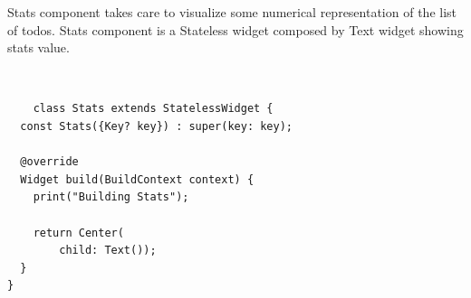 	Stats component takes care to visualize some numerical representation of the list of todos. Stats component is a Stateless widget composed by Text widget showing stats value.
	
	\mbox{}\\
	\begin{code}
	 \mbox{}
		\label{code:2.13}
	\begin{verbatim}
	class Stats extends StatelessWidget {
  const Stats({Key? key}) : super(key: key);

  @override
  Widget build(BuildContext context) {
    print("Building Stats");

    return Center(
        child: Text());
  }
}
	\end{verbatim}
	\end{code}
	\mbox{}
	